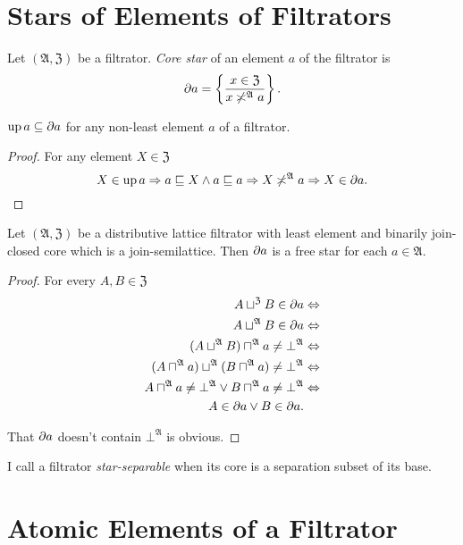 \section{Stars of Elements of Filtrators}
\begin{defn}
Let $(\mathfrak{A},\mathfrak{Z})$
be a filtrator. \emph{Core star} of an element $a$ of the filtrator
is
\[
\partial a=\left\{ \frac{x\in\mathfrak{Z}}{x\not\asymp^{\mathfrak{A}}a}\right\}.
\]
\end{defn}
\begin{prop}
$\operatorname{up} a\subseteq\partial a$ for any non-least element $a$ of a filtrator.\end{prop}
\begin{proof}
For any element $X\in\mathfrak{Z}$
\[
X\in\operatorname{up} a\Rightarrow a\sqsubseteq X\land a\sqsubseteq a\Rightarrow X\not\asymp^{\mathfrak{A}}a\Rightarrow X\in\partial a.
\]
\end{proof}
\begin{thm}
\label{part-is-free}Let $(\mathfrak{A},\mathfrak{Z})$ be a distributive
lattice filtrator with least element and binarily join-closed core
which is a join-semilattice. Then $\partial a$ is a free star for
each $a\in\mathfrak{A}$.\end{thm}
\begin{proof}
For every $A,B\in\mathfrak{Z}$
\begin{align*}
A\sqcup^{\mathfrak{Z}}B\in\partial a & \Leftrightarrow\\
A\sqcup^{\mathfrak{A}}B\in\partial a & \Leftrightarrow\\
(A\sqcup^{\mathfrak{A}}B)\sqcap^{\mathfrak{A}}a\ne\bot^{\mathfrak{A}} & \Leftrightarrow\\
(A\sqcap^{\mathfrak{A}}a)\sqcup^{\mathfrak{A}}(B\sqcap^{\mathfrak{A}}a)\ne\bot^{\mathfrak{A}} & \Leftrightarrow\\
A\sqcap^{\mathfrak{A}}a\ne\bot^{\mathfrak{A}}\lor B\sqcap^{\mathfrak{A}}a\ne\bot^{\mathfrak{A}} & \Leftrightarrow\\
A\in\partial a\lor B\in\partial a.
\end{align*}


That $\partial a$ doesn't contain $\bot^{\mathfrak{A}}$ is obvious.\end{proof}
\begin{defn}
I call a filtrator \emph{star-separable}
when its core is a separation subset of its base.
\end{defn}

\section{Atomic Elements of a Filtrator}

